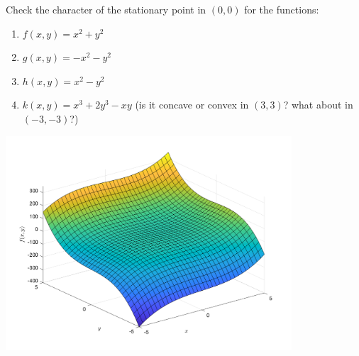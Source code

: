 \begin{Exercise}
    Check the character of the stationary point in $(0,0)$ for the functions:
    \begin{enumerate}
      \item $f(x,y)=x^2+y^2$
      \item $g(x,y)=-x^2-y^2$
      \item $h(x,y)=x^2-y^2$
      \item $k(x,y)=x^3+2y^3-xy$ (is it concave or convex in $(3,3)$? what about in $(-3,-3)$?)
    \end{enumerate}

\end{Exercise}

  \begin{center}
    \includegraphics[width=0.8\textwidth]{../figures/x3plus2y3minusxy.png}
  \end{center}


